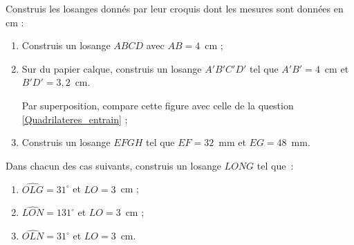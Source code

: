 \begin{exercice}
Construis les losanges donnés par leur croquis dont les mesures sont données en cm :
\begin{colenumerate}{2}
 \item
 
  
  \item
 
 
  \item
 
   
  \item
 
   
 \end{colenumerate}
\end{exercice}


\begin{exercice}[Losanges]
\begin{enumerate}
 \item Construis un losange $ABCD$ avec $AB = 4$ cm ; \label{Quadrilateres_entrain}
 \item Sur du papier calque, construis un losange $A'B'C'D'$ tel que $A'B' = 4$ cm et $B'D' = 3,2$ cm.
 
Par superposition, compare cette figure avec celle de la question \ref{Quadrilateres_entrain} ;
 \item Construis un losange $EFGH$ tel que $EF = 32$ mm et $EG = 48$ mm.
 \end{enumerate}
\end{exercice}


\begin{exercice}
Dans chacun des cas suivants, construis un losange $LONG$ tel que :
\begin{enumerate}
 \item $\widehat{OLG} = 31^\circ$ et $LO = 3$ cm ;
 \item $\widehat{LON} = 131^\circ$ et $LO = 3$ cm ;
 \item $\widehat{OLN} = 31^\circ$ et $LO = 3$ cm.
 \end{enumerate}
\end{exercice}


